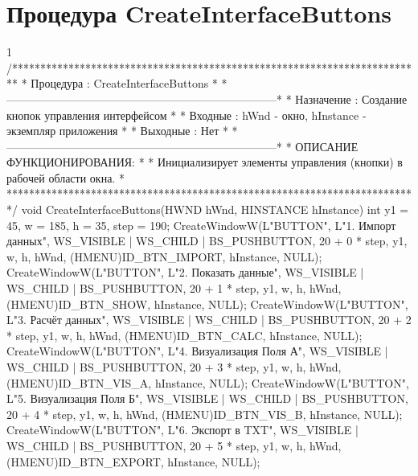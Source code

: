 \pagebreak

\section{Процедура CreateInterfaceButtons}
\footnotesize
\begin{listing}{1}
/*************************************************************************
* Процедура     : CreateInterfaceButtons                                 *
*------------------------------------------------------------------------*
* Назначение    : Создание кнопок управления интерфейсом                 *
* Входные       : hWnd - окно, hInstance - экземпляр приложения          *
* Выходные      : Нет                                                    *
*------------------------------------------------------------------------*
* ОПИСАНИЕ ФУНКЦИОНИРОВАНИЯ:                                             *
* Инициализирует элементы управления (кнопки) в рабочей области окна.    *
*************************************************************************/
void CreateInterfaceButtons(HWND hWnd, HINSTANCE hInstance) {
    int y1 = 45, w = 185, h = 35, step = 190;
    CreateWindowW(L"BUTTON", L"1. Импорт данных", WS_VISIBLE | WS_CHILD | BS_PUSHBUTTON, 
                  20 + 0 * step, y1, w, h, hWnd, (HMENU)ID_BTN_IMPORT, 
                  hInstance, NULL);
    CreateWindowW(L"BUTTON", L"2. Показать данные", WS_VISIBLE | WS_CHILD | BS_PUSHBUTTON, 
                  20 + 1 * step, y1, w, h, hWnd, (HMENU)ID_BTN_SHOW, 
                  hInstance, NULL);
    CreateWindowW(L"BUTTON", L"3. Расчёт данных", WS_VISIBLE | WS_CHILD | BS_PUSHBUTTON, 
                  20 + 2 * step, y1, w, h, hWnd, (HMENU)ID_BTN_CALC, 
                  hInstance, NULL);
    CreateWindowW(L"BUTTON", L"4. Визуализация Поля А", WS_VISIBLE | WS_CHILD | BS_PUSHBUTTON, 
                  20 + 3 * step, y1, w, h, hWnd, (HMENU)ID_BTN_VIS_A, 
                  hInstance, NULL);
    CreateWindowW(L"BUTTON", L"5. Визуализация Поля Б", WS_VISIBLE | WS_CHILD | BS_PUSHBUTTON, 
                  20 + 4 * step, y1, w, h, hWnd, (HMENU)ID_BTN_VIS_B, hInstance, NULL);
    CreateWindowW(L"BUTTON", L"6. Экспорт в TXT", WS_VISIBLE | WS_CHILD | BS_PUSHBUTTON, 
                  20 + 5 * step, y1, w, h, hWnd, (HMENU)ID_BTN_EXPORT, hInstance, NULL);
}
\end{listing}
\normalsize

\pagebreak

